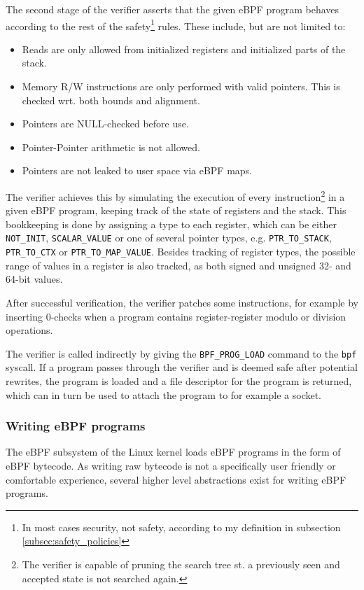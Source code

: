 The second stage of the verifier asserts that the given eBPF program behaves according to the rest of the safety\footnote{In most cases security, not safety, according to my definition in subsection \ref{subsec:safety_policies}} rules. These include, but are not limited to:
\begin{itemize}
\item Reads are only allowed from initialized registers and initialized parts of the stack. 
\item Memory R/W instructions are only performed with valid pointers. This is checked wrt. both bounds and alignment.
\item Pointers are NULL-checked before use. 
\item Pointer-Pointer arithmetic is not allowed.
  \item Pointers are not leaked to user space via eBPF maps. 
\end{itemize}

The verifier achieves this by simulating the execution of every instruction\footnote{The verifier is capable of pruning the search tree st. a previously seen and accepted state is not searched again.} in a given eBPF program, keeping track of the state of registers and the stack. This bookkeeping is done by assigning a type to each register, which can be either \texttt{NOT\_INIT}, \texttt{SCALAR\_VALUE} or one of several pointer types, e.g. \texttt{PTR\_TO\_STACK}, \texttt{PTR\_TO\_CTX} or \texttt{PTR\_TO\_MAP\_VALUE}.
Besides tracking of register types, the possible range of values in a register is also tracked, as both signed and unsigned 32- and 64-bit values.


After successful verification, the verifier patches some instructions, for example by inserting 0-checks when a program contains register-register modulo or division operations.


The verifier is called indirectly by giving the \verb!BPF_PROG_LOAD! command to the \verb!bpf! syscall. 
If a program passes through the verifier and is deemed safe after potential rewrites, the program is loaded and a file descriptor for the program is returned, which can in turn be used to attach the program to for example a socket. 

\subsubsection{Writing eBPF programs}
The eBPF subsystem of the Linux kernel loads eBPF programs in the form of eBPF bytecode. As writing raw bytecode is not a specifically user friendly or comfortable experience, several higher level abstractions exist for writing eBPF programs. 

